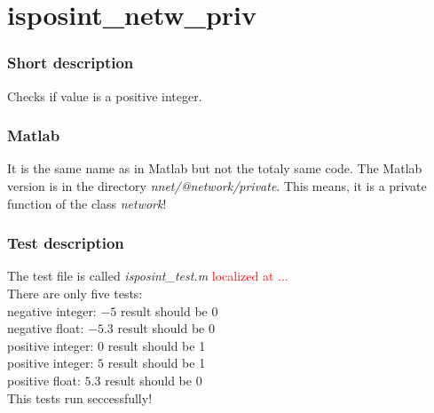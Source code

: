 \section{isposint\_netw\_priv}
\subsubsection{Short description}
Checks if value is a positive integer.\\

\subsubsection{Matlab}
It is the same name as in Matlab but not the totaly same code. The Matlab version is in the directory \textit{nnet/@network/private}. This means, it is a private function of the class \textit{network}! \linebreak

\subsubsection{Test description}
The test file is called \textit{isposint\_test.m} \textcolor{red}{localized at ...}\\
There are only five tests:\\
negative integer: $-5$ result should be 0\\
negative float: $-5.3$ result should be 0\\
positive integer: $0$ result should be 1\\
positive integer: $5$ result should be 1\\
positive float: $5.3$ result should be 0\\
This tests run seccessfully!

